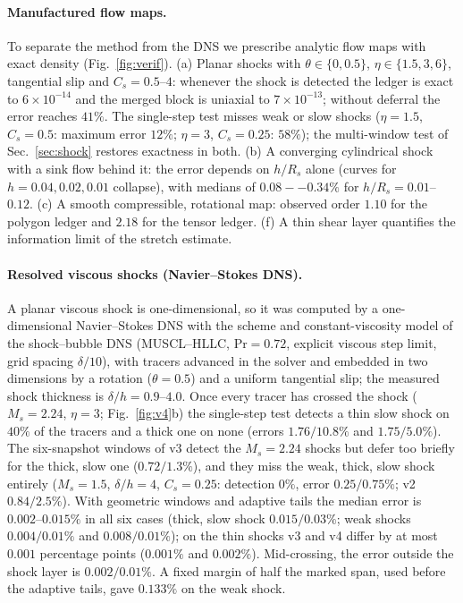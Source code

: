 \documentclass[11pt]{article}
\theoremstyle{definition}\newtheorem{definition}{Definition}\theoremstyle{remark}\newtheorem{remark}{Remark}
\begin{document}
\paragraph{Manufactured flow maps.} To separate the method from the DNS we prescribe analytic flow maps with exact density (Fig.~\ref{fig:verif}). (a) Planar shocks with $\theta\in\{0,0.5\}$, $\eta\in\{1.5,3,6\}$, tangential slip and $C_s=0.5$--$4$: whenever the shock is detected the ledger is exact to $6\times10^{-14}$ and the merged block is uniaxial to $7\times10^{-13}$; without deferral the error reaches $41\%$. The single-step test misses weak or slow shocks ($\eta=1.5$, $C_s=0.5$: maximum error $12\%$; $\eta=3$, $C_s=0.25$: $58\%$); the multi-window test of Sec.~\ref{sec:shock} restores exactness in both. (b) A converging cylindrical shock with a sink flow behind it: the error depends on $h/R_s$ alone (curves for $h=0.04,0.02,0.01$ collapse), with medians of $0.08--0.34\%$ for $h/R_s=0.01$--$0.12$. (c) A smooth compressible, rotational map: observed order $1.10$ for the polygon ledger and $2.18$ for the tensor ledger. (f) A thin shear layer quantifies the information limit of the stretch estimate.

\paragraph{Resolved viscous shocks (Navier--Stokes DNS).} A planar viscous shock is one-dimensional, so it was computed by a one-dimensional Navier--Stokes DNS with the scheme and constant-viscosity model of the shock--bubble DNS (MUSCL--HLLC, $\mathrm{Pr}=0.72$, explicit viscous step limit, grid spacing $\delta/10$), with tracers advanced in the solver and embedded in two dimensions by a rotation ($\theta=0.5$) and a uniform tangential slip; the measured shock thickness is $\delta/h=0.9\mbox{--}4.0$. Once every tracer has crossed the shock ($M_s=2.24$, $\eta=3$; Fig.~\ref{fig:v4}b) the single-step test detects a thin slow shock on $40\%$ of the tracers and a thick one on none (errors $1.76 / 10.8\%$ and $1.75 / 5.0\%$). The six-snapshot windows of v3 detect the $M_s=2.24$ shocks but defer too briefly for the thick, slow one ($0.72 / 1.3\%$), and they miss the weak, thick, slow shock entirely ($M_s=1.5$, $\delta/h=4$, $C_s=0.25$: detection $0\%$, error $0.25 / 0.75\%$; v2 $0.84 / 2.5\%$). With geometric windows and adaptive tails the median error is $0.002\mbox{--}0.015\%$ in all six cases (thick, slow shock $0.015 / 0.03\%$; weak shocks $0.004 / 0.01\%$ and $0.008 / 0.01\%$); on the thin shocks v3 and v4 differ by at most $0.001$ percentage points ($0.001\%$ and $0.002\%$). Mid-crossing, the error outside the shock layer is $0.002 / 0.01\%$. A fixed margin of half the marked span, used before the adaptive tails, gave $0.133\%$ on the weak shock.
\end{document}
